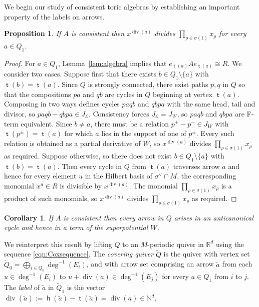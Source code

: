 \documentclass[11pt,a4paper]{amsart}
\numberwithin{equation}{section}
\newtheorem{proposition}[theorem]{Proposition}
\newtheorem{corollary}[theorem]{Corollary}
\theoremstyle{definition}
\theoremstyle{remark}
\newcommand{\NN}{\ensuremath{\mathbb{N}}}
\newcommand{\RR}{\ensuremath{\mathbb{R}}}
\renewcommand{\div}{\operatorname{div}}
\newcommand{\head}{\operatorname{\mathsf{h}}}
\newcommand{\tail}{\operatorname{\mathsf{t}}}
\begin{document}
  We begin our study of consistent toric algebras by establishing an important property of the labels on arrows.

\begin{proposition}
\label{prop:div(a)}
 If $A$ is consistent then $x^{\div(a)}$ divides $\prod_{\rho\in \sigma(1)} x_\rho$ for every $a\in Q_1$. 
  \end{proposition}
 \begin{proof}
For $a\in Q_1$,  Lemma~\ref{lem:algebra} implies that $e_{\tail(a)}Ae_{\tail(a)}\cong R$.  We consider two cases. Suppose first that there exists $b\in Q_1\setminus\{a\}$ with $\tail(b)=\tail(a)$. Since $Q$ is strongly connected, there exist paths $p, q$ in $Q$ so that the compositions $pa$ and $qb$ are cycles in $Q$ beginning at vertex $\tail(a)$. Composing in two ways defines cycles $paqb$ and $qbpa$ with the same head, tail and divisor, so $paqb-qbpa\in J_\mathscr{E}$. Consistency forces $J_\mathscr{E}=J_W$, so $paqb$ and $qbpa$ are F-term equivalent. Since $b\neq a$, there must be a relation $p^+-p^-\in J_W$ with $\tail(p^\pm)=\tail(a)$ for which $a$ lies in the support of one of $p^\pm$. Every such relation is obtained as a partial derivative of $W$, so $x^{\div(a)}$ divides $\prod_{\rho\in \sigma(1)} x_\rho$ as required. Suppose otherwise, so there does not exist $b\in Q_1\setminus\{a\}$ with $\tail(b)=\tail(a)$.  Then every cycle in $Q$ from $\tail(a)$ traverses arrow $a$ and hence for every element $u$ in the Hilbert basis of $\sigma^\vee\cap M$, the corresponding monomial $x^u\in R$ is divisible by $x^{\div(a)}$. The monomial $\prod_{\rho\in \sigma(1)} x_\rho$ is a product of such monomials, so $x^{\div(a)}$ divides $\prod_{\rho\in \sigma(1)} x_\rho$ as required.
 \end{proof}

 \begin{corollary}
 \label{cor:allarrowsinW}
  If $A$ is consistent then every arrow in $Q$ arises in an anticanonical cycle and hence in a term of the superpotential $W$.
  \end{corollary}
  
 We reinterpret this result by lifting $Q$ to an $M$-periodic quiver in $\RR^d$ using the sequence \eqref{eqn:Coxsequence}. The \emph{covering quiver} $\widetilde{Q}$ is the quiver with vertex set $\widetilde{Q}_0=\bigoplus_{i\in Q_0} \deg^{-1}(E_i)$, and with arrow set comprising an arrow $\widetilde{a}$ from each $u\in \deg^{-1}(E_i)$ to $u+\div(a)\in \deg^{-1}(E_j)$ for every $a\in Q_1$ from $i$ to $j$. The \emph{label} of $\widetilde{a}$ in $\widetilde{Q}_1$ is the vector $\div(\widetilde{a}):=\head(\widetilde{a})-\tail(\widetilde{a}) =\div(a)\in \NN^d$.
\end{document}
